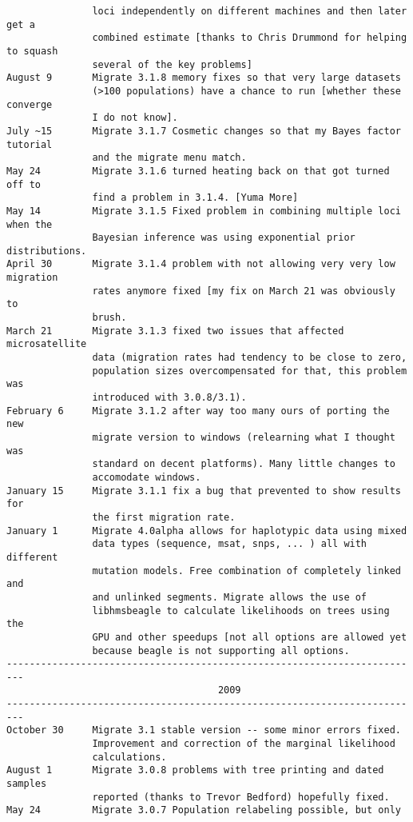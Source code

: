 \begin{small}
\begin{verbatim}
               loci independently on different machines and then later get a 
               combined estimate [thanks to Chris Drummond for helping to squash
               several of the key problems]
August 9       Migrate 3.1.8 memory fixes so that very large datasets
               (>100 populations) have a chance to run [whether these converge
               I do not know].
July ~15       Migrate 3.1.7 Cosmetic changes so that my Bayes factor tutorial
               and the migrate menu match.
May 24         Migrate 3.1.6 turned heating back on that got turned off to 
               find a problem in 3.1.4. [Yuma More]
May 14         Migrate 3.1.5 Fixed problem in combining multiple loci when the
               Bayesian inference was using exponential prior distributions.
April 30       Migrate 3.1.4 problem with not allowing very very low migration
               rates anymore fixed [my fix on March 21 was obviously to 
               brush.
March 21       Migrate 3.1.3 fixed two issues that affected microsatellite
               data (migration rates had tendency to be close to zero,
               population sizes overcompensated for that, this problem was
               introduced with 3.0.8/3.1).
February 6     Migrate 3.1.2 after way too many ours of porting the new
               migrate version to windows (relearning what I thought was 
               standard on decent platforms). Many little changes to 
               accomodate windows. 
January 15     Migrate 3.1.1 fix a bug that prevented to show results for
               the first migration rate.
January 1      Migrate 4.0alpha allows for haplotypic data using mixed
               data types (sequence, msat, snps, ... ) all with different
               mutation models. Free combination of completely linked and
               and unlinked segments. Migrate allows the use of
               libhmsbeagle to calculate likelihoods on trees using the
               GPU and other speedups [not all options are allowed yet
               because beagle is not supporting all options.
-------------------------------------------------------------------------
                                     2009
-------------------------------------------------------------------------
October 30     Migrate 3.1 stable version -- some minor errors fixed. 
               Improvement and correction of the marginal likelihood 
               calculations.
August 1       Migrate 3.0.8 problems with tree printing and dated samples
               reported (thanks to Trevor Bedford) hopefully fixed. 
May 24         Migrate 3.0.7 Population relabeling possible, but only 

\end{verbatim}
\end{small}
